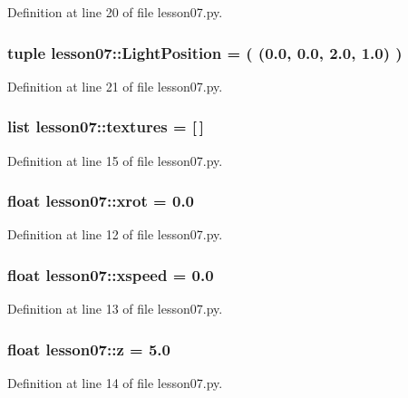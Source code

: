 Definition at line 20 of file lesson07.py.
\subsubsection{\setlength{\rightskip}{0pt plus 5cm}tuple {\bf lesson07::LightPosition} = ( (0.0, 0.0, 2.0, 1.0) )\hspace{0.3cm}{\tt  [static]}}\label{namespacelesson07_721a9b885e5e20804109e3178db614d6}




Definition at line 21 of file lesson07.py.
\subsubsection{\setlength{\rightskip}{0pt plus 5cm}list {\bf lesson07::textures} = [$\,$]\hspace{0.3cm}{\tt  [static]}}\label{namespacelesson07_f96d1c36ee197d9c946d16ef12b5e2c0}




Definition at line 15 of file lesson07.py.
\subsubsection{\setlength{\rightskip}{0pt plus 5cm}float {\bf lesson07::xrot} = 0.0\hspace{0.3cm}{\tt  [static]}}\label{namespacelesson07_8a0b76f42d6e40ac1f5210456f152301}




Definition at line 12 of file lesson07.py.
\subsubsection{\setlength{\rightskip}{0pt plus 5cm}float {\bf lesson07::xspeed} = 0.0\hspace{0.3cm}{\tt  [static]}}\label{namespacelesson07_ed377a723285482085e627811e27a382}




Definition at line 13 of file lesson07.py.
\subsubsection{\setlength{\rightskip}{0pt plus 5cm}float {\bf lesson07::z} = 5.0\hspace{0.3cm}{\tt  [static]}}\label{namespacelesson07_300b3993cece487e61022e68776ed2b1}




Definition at line 14 of file lesson07.py.